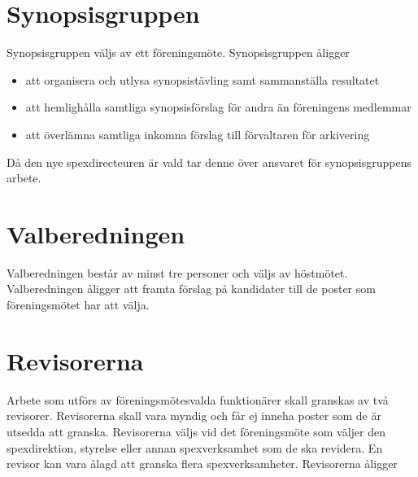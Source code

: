 \documentclass[a4paper]{article}
\begin{document}
\section{Synopsisgruppen}
\label{section:synopsisgruppen}

Synopsisgruppen väljs av ett föreningsmöte.\newline
\newline
Synopsisgruppen åligger

\begin{itemize}
  \item att organisera och utlysa synopsistävling samt sammanställa resultatet
  \item att hemlighålla samtliga synopsisförslag för andra än föreningens medlemmar 
  \item att överlämna samtliga inkomna förslag till förvaltaren för arkivering
\end{itemize}

\noindent
Då den nye spexdirecteuren är vald tar denne över ansvaret för synopsisgruppens arbete.

\section{Valberedningen}
\label{section:valberedningen}

Valberedningen består av minst tre personer och väljs av höstmötet.\newline
\newline
Valberedningen åligger att framta förslag på kandidater till de poster som föreningsmötet har att välja.

\section{Revisorerna}
\label{section:revisorerna}

Arbete som utförs av föreningsmötesvalda funktionärer skall granskas av två revisorer. Revisorerna skall vara myndig och får ej inneha poster som de är utsedda att granska.\newline
\newline
Revisorerna väljs vid det föreningsmöte som väljer den spexdirektion, styrelse eller annan spexverksamhet som de ska revidera. En revisor kan vara ålagd att granska flera spexverksamheter.\newline
\newline
Revisorerna åligger
\end{document}

